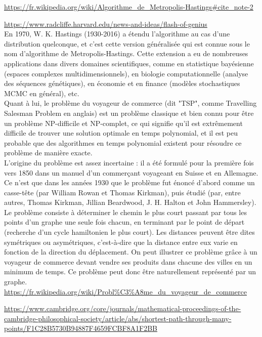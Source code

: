 \documentclass{article}
\begin{document}
\url{https://fr.wikipedia.org/wiki/Algorithme_de_Metropolis-Hastings#cite_note-2}

\url{https://www.radcliffe.harvard.edu/news-and-ideas/flash-of-genius} \\

En 1970, W. K. Hastings (1930-2016) a étendu l'algorithme au cas d'une distribution quelconque, et c'est cette version généralisée qui est connue sous le nom d'algorithme de Metropolis-Hastings. Cette extension a eu de nombreuses applications dans divers domaines scientifiques, comme en statistique bayésienne (espaces complexes multidimensionnels), en biologie computationnelle (analyse des séquences génétiques), en économie et en finance (modèles stochastiques MCMC en général), etc. \\

Quant à lui, le problème du voyageur de commerce (dit "TSP", comme Travelling Salesman Problem en anglais) est un problème classique et bien connu pour être un problème NP-difficile et NP-complet, ce qui signifie qu'il est extrêmement difficile de trouver une solution optimale en temps polynomial, et il est peu probable que des algorithmes en temps polynomial existent pour résoudre ce problème de manière exacte. \\
L'origine du problème est assez incertaine : il a été formulé pour la première fois vers 1850 dans un manuel d'un commerçant voyageant en Suisse et en Allemagne. Ce n'est que dans les années 1930 que le problème fut énoncé d'abord comme un casse-tête (par William Rowan et Thomas Kirkman), puis étudié (par, entre autres, Thomas Kirkman, Jillian Beardwood, J. H. Halton et John Hammersley). \\ 
Le problème consiste à déterminer le chemin le plus court passant par tous les points d'un graphe une seule fois chacun, en terminant par le point de départ (recherche d'un cycle hamiltonien le plus court). Les distances peuvent être dites symétriques ou asymétriques, c'est-à-dire que la distance entre eux varie en fonction de la direction du déplacement. On peut illustrer ce problème grâce à un voyageur de commerce devant vendre ses produits dans chacune des villes en un minimum de temps. Ce problème peut donc être naturellement représenté par un graphe.\\

\url{https://fr.wikipedia.org/wiki/Probl\%C3\%A8me_du_voyageur_de_commerce}

\url{https://www.cambridge.org/core/journals/mathematical-proceedings-of-the-cambridge-philosophical-society/article/abs/shortest-path-through-many-points/F1C28B5730B94887F4659FCBF8A1F2BB} %
\end{document}
